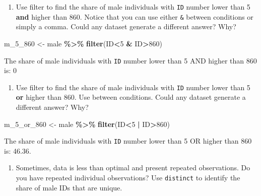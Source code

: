 \documentclass[
]{book}
\newenvironment{Shaded}{\begin{snugshade}}{\end{snugshade}}
\newcommand{\DecValTok}[1]{\textcolor[rgb]{0.00,0.00,0.81}{#1}}
\newcommand{\FunctionTok}[1]{\textcolor[rgb]{0.13,0.29,0.53}{\textbf{#1}}}
\newcommand{\NormalTok}[1]{#1}
\newcommand{\OtherTok}[1]{\textcolor[rgb]{0.56,0.35,0.01}{#1}}
\newcommand{\SpecialCharTok}[1]{\textcolor[rgb]{0.81,0.36,0.00}{\textbf{#1}}}
\providecommand{\tightlist}{%
  \setlength{\itemsep}{0pt}\setlength{\parskip}{0pt}}
\begin{document}
\begin{enumerate}
\def\labelenumi{\arabic{enumi}.}
\setcounter{enumi}{7}
\tightlist
\item
  Use filter to find the share of male individuals with \texttt{ID} number lower than 5 \textbf{and} higher than 860. Notice that you can use either \texttt{\&} between conditions or simply a comma. Could any dataset generate a different answer? Why?
\end{enumerate}

\begin{Shaded}
\begin{Highlighting}[]
\NormalTok{m\_5\_860 }\OtherTok{\textless{}{-}}\NormalTok{ male }\SpecialCharTok{\%\textgreater{}\%}
  \FunctionTok{filter}\NormalTok{(ID}\SpecialCharTok{\textless{}}\DecValTok{5} \SpecialCharTok{\&}\NormalTok{ ID}\SpecialCharTok{\textgreater{}}\DecValTok{860}\NormalTok{)}
\end{Highlighting}
\end{Shaded}

The share of male individuals with \texttt{ID} number lower than 5 AND higher than 860 is: 0

\begin{enumerate}
\def\labelenumi{\arabic{enumi}.}
\setcounter{enumi}{8}
\tightlist
\item
  Use filter to find the share of male individuals with \texttt{ID} number lower than 5 \textbf{or} higher than 860. Use \texttt{\textbar{}} between conditions. Could any dataset generate a different answer? Why?
\end{enumerate}

\begin{Shaded}
\begin{Highlighting}[]
\NormalTok{m\_5\_or\_860 }\OtherTok{\textless{}{-}}\NormalTok{ male }\SpecialCharTok{\%\textgreater{}\%}
  \FunctionTok{filter}\NormalTok{(ID}\SpecialCharTok{\textless{}}\DecValTok{5} \SpecialCharTok{|}\NormalTok{ ID}\SpecialCharTok{\textgreater{}}\DecValTok{860}\NormalTok{)}
\end{Highlighting}
\end{Shaded}

The share of male individuals with \texttt{ID} number lower than 5 OR higher than 860 is: 46.36.

\begin{enumerate}
\def\labelenumi{\arabic{enumi}.}
\setcounter{enumi}{9}
\tightlist
\item
  Sometimes, data is less than optimal and present repeated observations. Do you have repeated individual observations? Use \texttt{distinct} to identify the share of male IDs that are unique.
\end{enumerate}
\end{document}
